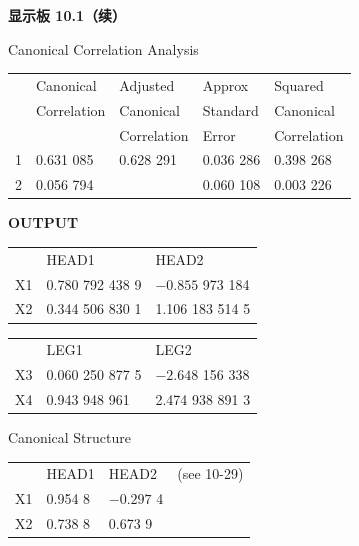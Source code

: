
\noindent\textbf{显示板 10.1（续）}

\begin{mvbox}
{\ttfamily\small
Canonical Correlation Analysis\par
\vspace{8pt}
{\centering
\begin{tabular}{lllll}
 & Canonical & Adjusted & Approx & Squared\\
 & Correlation & Canonical & Standard & Canonical\\
 & & Correlation & Error & Correlation\\[4pt]
1 & 0.631 085 & 0.628 291 & 0.036 286 & 0.398 268\\
2 & 0.056 794 & & 0.060 108 & 0.003 226
\end{tabular}\par}
\vspace{12pt}

{\centering
{}\hfill{\bfseries\rmfamily OUTPUT}\par}
\vspace{8pt}
{\centering
\begin{tabular}{lll}
 & HEAD1 & HEAD2\\
X1 & 0.780 792 438 9 & $-0.855$ 973 184\\
X2 & 0.344 506 830 1 & 1.106 183 514 5
\end{tabular}\par}
\vspace{12pt}

{\centering
{}\par}
\vspace{8pt}
{\centering
\begin{tabular}{lll}
 & LEG1 & LEG2\\
X3 & 0.060 250 877 5 & $-2.648$ 156 338\\
X4 & 0.943 948 961 & 2.474 938 891 3
\end{tabular}\par}
\vspace{12pt}

Canonical Structure\par
\vspace{8pt}
{\centering
{}\par}
\vspace{8pt}
{\centering
\begin{tabular}{llll}
 & HEAD1 & HEAD2 & (see 10-29)\\
X1 & 0.954 8 & $-0.297$ 4 &\\
X2 & 0.738 8 & 0.673 9 &
\end{tabular}\par}
\vspace{12pt}

}
\end{mvbox}
